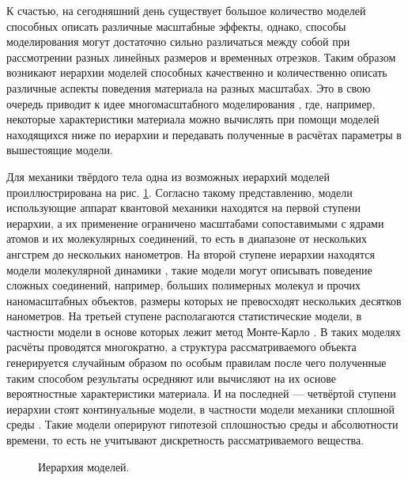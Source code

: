 К счастью, на сегодняшний день существует большое количество моделей способных описать различные масштабные эффекты, однако, способы моделирования могут достаточно сильно различаться между собой при рассмотрении разных линейных размеров и временных отрезков. Таким образом возникают иерархии моделей способных качественно и количественно описать различные аспекты поведения материала на разных масштабах. Это в свою очередь приводит к идее многомасштабного моделирования \cite{Multiscale1}, где, например, некоторые характеристики материала можно вычислять при помощи моделей находящихся ниже по иерархии и передавать полученные в расчётах параметры в вышестоящие модели.

Для механики твёрдого тела одна из возможных иерархий моделей проиллюстрирована на рис. \ref{fig:ModelsHierarchy}. Согласно такому представлению, модели использующие аппарат квантовой механики \cite{QuantumModelling1, QuantumModelling2} находятся на первой ступени иерархии, а их применение ограничено масштабами сопоставимыми с ядрами атомов и их молекулярных соединений, то есть в диапазоне от нескольких ангстрем до нескольких нанометров. На второй ступене иерархии находятся модели молекулярной динамики \cite{MD1, MD2, MD3, MD4}, такие модели могут описывать поведение сложных соединений, например, больших полимерных молекул и прочих наномасштабных объектов, размеры которых не превосходят нескольких десятков нанометров. На третьей ступене располагаются статистические модели, в частности модели в основе которых лежит метод Монте-Карло \cite{MonteCarlo1, MonteCarlo2}. В таких моделях расчёты проводятся многократно, а структура рассматриваемого объекта генерируется случайным образом по особым правилам после чего полученные таким способом результаты осредняют или вычисляют на их основе вероятностные характеристики материала. И на последней --- четвёртой ступени иерархии стоят континуальные модели, в частности модели механики сплошной среды \cite{MSS}. Такие модели оперируют гипотезой сплошностью среды и абсолютности времени, то есть не учитывают дискретность рассматриваемого вещества.

\begin{figure}[ht]
    \caption{Иерархия моделей.}\label{fig:ModelsHierarchy}
\end{figure}


